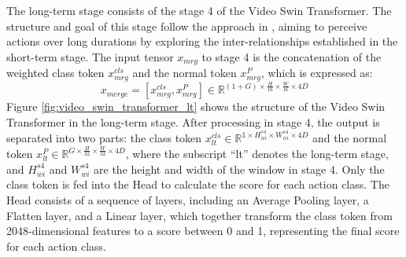 The long-term stage consists of the stage 4 of the Video Swin Transformer. The structure and goal of this stage follow the approach in \cite{pan_egovit_2023}, aiming to perceive actions over long durations by exploring the inter-relationships established in the short-term stage. The input tensor $x_{mrg}$ to stage 4 is the concatenation of the weighted class token $x^{cls}_{mrg}$ and the normal token $x^{P}_{mrg}$, which is expressed as:
\begin{equation}
    x_{merge} = [x^{cls}_{mrg}, x^{P}_{mrg}] \in \mathbb{R}^{(1 + G) \times \frac{H}{16} \times \frac{W}{16} \times 4D}
\end{equation}
Figure \ref{fig:video_swin_transformer_lt} shows the structure of the Video Swin Transformer in the long-term stage. After processing in stage 4, the output is separated into two parts: the class token $x^{cls}_{lt} \in \mathbb{R}^{1 \times H^{s4}_{wi} \times W^{s4}_{wi} \times 4D}$ and the normal token $x^{P}_{lt} \in \mathbb{R}^{G \times \frac{H}{32} \times \frac{W}{32} \times 4D}$, where the subscript “lt” denotes the long-term stage, and $H^{s4}_{wi}$ and $W^{s4}_{wi}$ are the height and width of the window in stage 4. Only the class token is fed into the Head to calculate the score for each action class. The Head consists of a sequence of layers, including an Average Pooling layer, a Flatten layer, and a Linear layer, which together transform the class token from 2048-dimensional features to a score between 0 and 1, representing the final score for each action class. 

